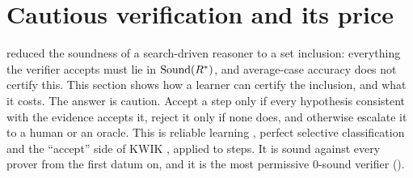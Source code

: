 \providecommand{\ACCEPT}{\textsf{ACCEPT}}
\providecommand{\REJECT}{\textsf{REJECT}}
\providecommand{\ESCALATE}{\textsf{ESCALATE}}
\providecommand{\vars}{\mathrm{vars}}
\providecommand{\Bell}{\mathrm{Bell}}
\providecommand{\ccl}{\mathrm{cl}}
\providecommand{\Htag}[1]{H^{\mathrm{tag}}_{#1}}
\providecommand{\nesc}{\#\mathrm{ESC}}

\section{Cautious verification and its price}\label{sec:caution}

 reduced the soundness of a search-driven reasoner to a set inclusion: everything the verifier accepts must lie in $\mathrm{Sound}(R^{*})$, and average-case accuracy does not certify this. This section shows how a learner can certify the inclusion, and what it costs. The answer is caution. Accept a step only if every hypothesis consistent with the evidence accepts it, reject it only if none does, and otherwise escalate it to a human or an oracle. This is reliable learning \citep{rivest1988learning}, perfect selective classification \citep{elyaniv2010foundations} and the ``accept'' side of KWIK \citep{li2008knows}, applied to steps. It is sound against every prover from the first datum on, and it is the most permissive $0$-sound verifier ().

